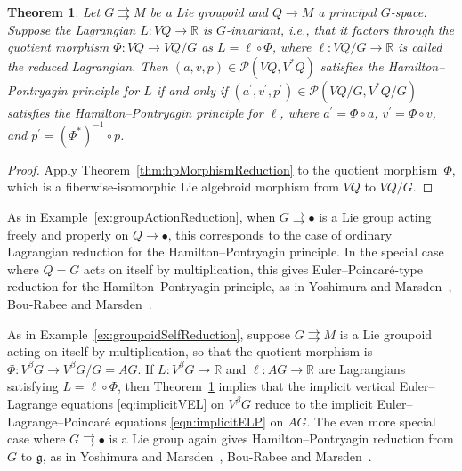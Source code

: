 \documentclass[10pt,a4paper]{amsart}
\numberwithin{equation}{section}
\newtheorem{Theorem}{Theorem}[section]
\begin{document}
\begin{Theorem} \label{thm:hpGroupoidReduction}
 Let $ G \rightrightarrows M $ be a Lie groupoid and $ Q \rightarrow M $ a principal $G$-space. Suppose the Lagrangian $ L \colon V Q \rightarrow \mathbb{R} $ is $G$-invariant, i.e., that it factors through the quotient morphism $ \Phi \colon V Q \rightarrow V Q / G $ as $ L = \ell \circ \Phi $, where $ \ell \colon V Q / G \rightarrow \mathbb{R} $ is called the reduced Lagrangian. Then $ ( a, v, p ) \in \mathcal{P} ( V Q , V ^\ast Q ) $ satisfies the Hamilton--Pontryagin principle for $L$ if and only if $ ( a ^\prime , v ^\prime , p ^\prime ) \in \mathcal{P} ( V Q / G, V ^\ast Q / G ) $ satisfies the Hamilton--Pontryagin principle for $ \ell $, where $ a ^\prime = \Phi \circ a $, $ v ^\prime = \Phi \circ v $, and $ p ^\prime = (\Phi ^\ast) ^{-1} \circ p $.
\end{Theorem}

\begin{proof} Apply Theorem~\ref{thm:hpMorphismReduction} to the quotient morphism~$\Phi$, which is a f\/iberwise-isomorphic Lie algebroid morphism from $ V Q $ to $ V Q / G $.
\end{proof}

\begin{Example}As in Example~\ref{ex:groupActionReduction}, when $ G \rightrightarrows \bullet $ is a Lie group acting freely and properly on $ Q \rightarrow \bullet $, this corresponds to the case of ordinary Lagrangian reduction for the Hamilton--Pontryagin principle. In the special case where $ Q = G $ acts on itself by multiplication, this gives Euler--Poincar\'e-type reduction for the Hamilton--Pontryagin principle, as in Yoshimura and Marsden~\cite{YoMa2007}, Bou-Rabee and Marsden~\cite{BoMa2009}.
\end{Example}

\begin{Example}As in Example~\ref{ex:groupoidSelfReduction}, suppose $ G \rightrightarrows M $ is a Lie groupoid acting on itself by multiplication, so that the quotient morphism is $ \Phi \colon V ^\beta G \rightarrow V ^\beta G / G = A G $. If $ L \colon V ^\beta G \rightarrow \mathbb{R} $ and $ \ell \colon A G \rightarrow \mathbb{R} $ are Lagrangians satisfying $ L = \ell \circ \Phi $, then Theorem~\ref{thm:hpGroupoidReduction} implies that the implicit vertical Euler--Lagrange equations \eqref{eq:implicitVEL} on $ V ^\beta G $ reduce to the implicit Euler--Lagrange--Poincar\'e equations \eqref{eqn:implicitELP} on $ A G $. The even more special case where $ G \rightrightarrows \bullet $ is a Lie group again gives Hamilton--Pontryagin reduction from $G$ to $ \mathfrak{g} $, as in Yoshimura and Marsden~\cite{YoMa2007}, Bou-Rabee and Marsden~\cite{BoMa2009}.
\end{Example}
\end{document}
